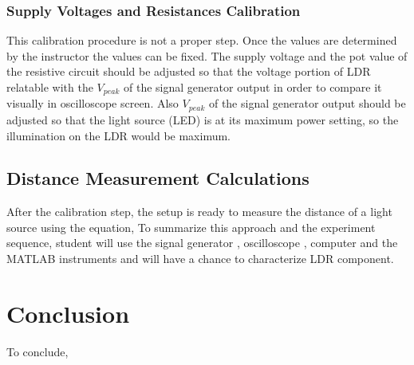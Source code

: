 \documentclass[letterpaper,12pt]{article}
\begin{document}
\subsubsection{Supply Voltages and Resistances Calibration}
This calibration procedure is not a proper step. Once the values are determined by the instructor the values can be fixed. The supply voltage and the pot value of the resistive circuit should be adjusted so that the voltage portion of LDR relatable with the \(V_{peak}\) of the signal generator output  in order to compare it visually in oscilloscope screen. Also  \(V_{peak}\) of the signal generator output should be adjusted so that the light source (LED) is at its maximum power setting, so the illumination on the LDR would be maximum. 
\subsection{Distance Measurement Calculations}
After the calibration step, the setup is ready to measure the distance of a light source using the equation,
To summarize this approach and the experiment sequence, student will use the signal generator , oscilloscope , computer and the MATLAB instruments and will have a chance to characterize LDR component. 
\section{Conclusion}
To conclude,





\end{document}
